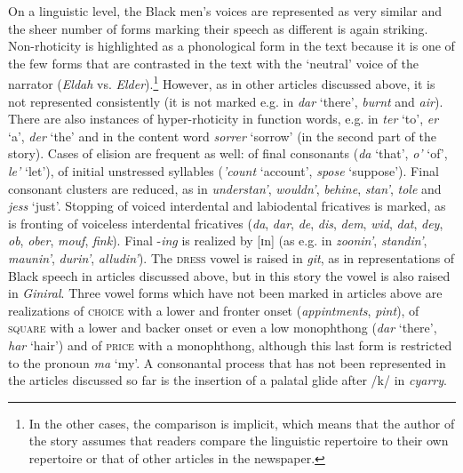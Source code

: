 On a linguistic level, the Black men’s voices are represented as very similar and the sheer number of forms marking their speech as different is again striking. Non-rhoticity is highlighted as a phonological form in the text because it is one of the few forms that are contrasted in the text with the ‘neutral’ voice of the narrator (\emph{Eldah} vs. \emph{Elder}).\footnote{In the other cases, the comparison is implicit, which means that the author of the story assumes that readers compare the linguistic repertoire to their own repertoire or that of other articles in the newspaper.} However, as in other articles discussed above, it is not represented consistently (it is not marked e.g. in \emph{dar} ‘there’, \emph{burnt} and \emph{air}). There are also instances of hyper-rhoticity in function words, e.g. in \emph{ter} ‘to’, \emph{er} ‘a’, \emph{der} ‘the’ and in the content word \emph{sorrer} ‘sorrow’ (in the second part of the story). Cases of elision are frequent as well: of final consonants (\emph{da} ‘that’, \emph{o’} ‘of’, \emph{le’} ‘let’), of initial unstressed syllables (\emph{’count} ‘account’, \emph{spose} ‘suppose’). Final consonant clusters are reduced, as in \emph{understan’}, \emph{wouldn’}, \emph{behine}, \emph{stan’}, \emph{tole} and \emph{jess} ‘just’. Stopping of voiced interdental and labiodental fricatives is marked, as is fronting of voiceless interdental fricatives (\emph{da}, \emph{dar}, \emph{de}, \emph{dis}, \emph{dem}, \emph{wid}, \emph{dat}, \emph{dey}, \emph{ob}, \emph{ober}, \emph{mouf}, \emph{fink}). Final -\emph{ing} is realized by [ɪn] (as e.g. in \emph{zoonin’}, \emph{standin’}, \emph{maunin’}, \emph{durin’}, \emph{alludin’}). The \textsc{dress} vowel is raised in \emph{git}, as in representations of Black speech in articles discussed above, but in this story the vowel is also raised in \emph{Giniral}. Three vowel forms which have not been marked in articles above are realizations of \textsc{choice} with a lower and fronter onset (\emph{appintments}, \emph{pint}), of \textsc{square} with a lower and backer onset or even a low monophthong (\emph{dar} ‘there’, \emph{har} ‘hair’) and of \textsc{price} with a monophthong, although this last form is restricted to the pronoun \emph{ma} ‘my’. A consonantal process that has not been represented in the articles discussed so far is the insertion of a palatal glide after /k/ in \emph{cyarry}.

